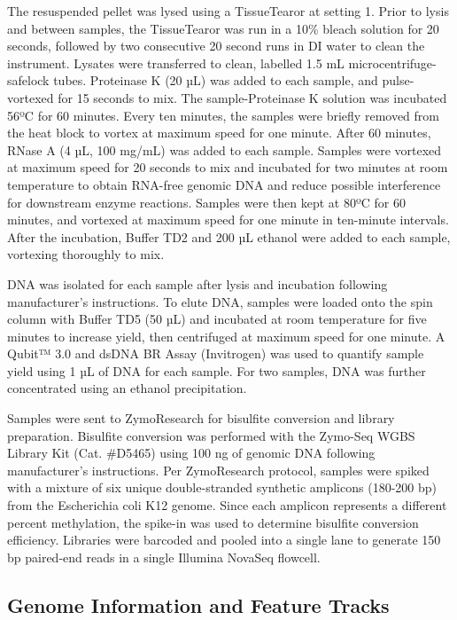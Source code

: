 \documentclass [11pt, proquest] {uwthesis}[2015/03/03]
\begin{document}
The resuspended pellet was lysed using a TissueTearor at setting 1. Prior to lysis and between samples, the TissueTearor was run in a 10\% bleach solution for 20 seconds, followed by two consecutive 20 second runs in DI water to clean the instrument. Lysates were transferred to clean, labelled 1.5 mL microcentrifuge-safelock tubes. Proteinase K (20 µL) was added to each sample, and pulse-vortexed for 15 seconds to mix. The sample-Proteinase K solution was incubated 56ºC for 60 minutes. Every ten minutes, the samples were briefly removed from the heat block to vortex at maximum speed for one minute. After 60 minutes, RNase A (4 µL, 100 mg/mL) was added to each sample. Samples were vortexed at maximum speed for 20 seconds to mix and incubated for two minutes at room temperature to obtain RNA-free genomic DNA and reduce possible interference for downstream enzyme reactions. Samples were then kept at 80ºC for 60 minutes, and vortexed at maximum speed for one minute in ten-minute intervals. After the incubation, Buffer TD2 and 200 µL ethanol were added to each sample, vortexing thoroughly to mix.

DNA was isolated for each sample after lysis and incubation following manufacturer's instructions. To elute DNA, samples were loaded onto the spin column with Buffer TD5 (50 µL) and incubated at room temperature for five minutes to increase yield, then centrifuged at maximum speed for one minute. A Qubit™ 3.0 and dsDNA BR Assay (Invitrogen) was used to quantify sample yield using 1 µL of DNA for each sample. For two samples, DNA was further concentrated using an ethanol precipitation.

Samples were sent to ZymoResearch for bisulfite conversion and library preparation. Bisulfite conversion was performed with the Zymo-Seq WGBS Library Kit (Cat. \#D5465) using 100 ng of genomic DNA following manufacturer's instructions. Per ZymoResearch protocol, samples were spiked with a mixture of six unique double-stranded synthetic amplicons (180-200 bp) from the Escherichia coli K12 genome. Since each amplicon represents a different percent methylation, the spike-in was used to determine bisulfite conversion efficiency. Libraries were barcoded and pooled into a single lane to generate 150 bp paired-end reads in a single Illumina NovaSeq flowcell.

\hypertarget{genome-information-and-feature-tracks}{%
\subsection{Genome Information and Feature Tracks}\label{genome-information-and-feature-tracks}}
\end{document}
